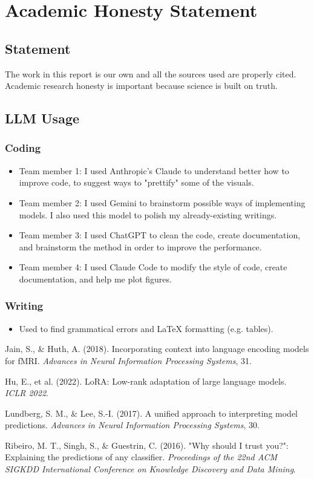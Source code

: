 \documentclass[letterpaper,11pt]{article}
\begin{document}
\section*{Academic Honesty Statement}
\subsection{Statement}
The work in this report is our own and all the sources used are properly cited. Academic research honesty is important because science is built on truth.
\subsection{LLM Usage}


\subsubsection*{Coding}
\begin{itemize}
    \item Team member 1: I used Anthropic's Claude to understand better how to improve code, to suggest ways to "prettify" some of the visuals.
    \item Team member 2: I used Gemini to brainstorm possible ways of implementing models. I also used this model to polish my already-existing writings.
    \item Team member 3:  I used ChatGPT to clean the code, create documentation, and brainstorm the method in order to improve the performance.
    \item Team member 4:  I used Claude Code to modify the style of code, create documentation, and help me plot figures.
\end{itemize}

\subsubsection*{Writing}
\begin{itemize}
    \item Used to find grammatical errors and LaTeX formatting (e.g. tables).
\end{itemize}





Jain, S., \& Huth, A. (2018).
Incorporating context into language encoding models for fMRI.
\textit{Advances in Neural Information Processing Systems}, 31.


Hu, E., et al. (2022). LoRA: Low-rank adaptation of large language models.
\textit{ICLR 2022}.

Lundberg, S. M., \& Lee, S.-I. (2017).
A unified approach to interpreting model predictions.
\textit{Advances in Neural Information Processing Systems}, 30.

Ribeiro, M. T., Singh, S., \& Guestrin, C. (2016).
"Why should I trust you?": Explaining the predictions of any classifier.
\textit{Proceedings of the 22nd ACM SIGKDD International Conference on Knowledge Discovery and Data Mining}.
\end{document}
